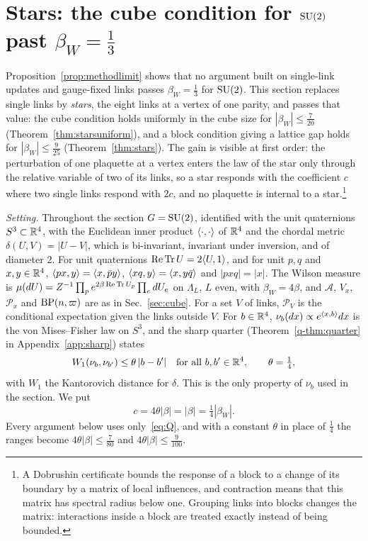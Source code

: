 \section{Stars: the cube condition for \texorpdfstring{$\mathrm{SU}(2)$}{SU(2)} past \texorpdfstring{$\beta_W=\frac13$}{beta\_W=1/3}}\label{sec:stars}

Proposition~\ref{prop:methodlimit} shows that no argument built on single-link
updates and gauge-fixed links passes $\beta_W=\frac13$ for $\mathrm{SU}(2)$. This
section replaces single links by \emph{stars}, the eight links at a vertex of
one parity, and passes that value: the cube condition holds uniformly in the
cube size for $|\beta_W|\le\frac7{20}$
(Theorem~\ref{thm:starsuniform}), and a block condition giving a lattice gap
holds for $|\beta_W|\le\frac9{25}$ (Theorem~\ref{thm:stars}). The gain is
visible at first order: the perturbation of one plaquette at a vertex enters
the law of the star only through the relative variable of two of its links,
so a star responds with the coefficient $c$ where two single links respond
with $2c$, and no plaquette is internal to a star.\footnote{A Dobrushin
certificate bounds the response of a block to a change of its boundary by a
matrix of local influences, and contraction means that this matrix has
spectral radius below one. Grouping links into blocks changes the matrix:
interactions inside a block are treated exactly instead of being bounded.}

\emph{Setting.} Throughout the section $G=\mathrm{SU}(2)$, identified with the unit
quaternions $S^3\subset\mathbb{R}^4$, with the Euclidean inner product
$\langle \cdot,\cdot\rangle$ of $\mathbb{R}^4$ and the chordal metric $\delta(U,V)=|U-V|$, which is
bi-invariant, invariant under inversion, and of diameter $2$. For unit
quaternions $\operatorname{Re}\operatorname{Tr} U=2\langle U,1\rangle$, and for unit $p,q$ and $x,y\in\mathbb{R}^4$,
$\langle px,y\rangle=\langle x,\bar py\rangle$, $\langle xq,y\rangle=\langle x,y\bar q\rangle$ and $|pxq|=|x|$. The
Wilson measure is $\mu(dU)=Z^{-1}\prod_pe^{2\beta\operatorname{Re}\operatorname{Tr} U_p}\prod_edU_e$ on
$\Lambda_L$, $L$ even, with $\beta_W=4\beta$, and $\mathcal A$, $V_x$,
$\mathcal P_x$ and $\mathrm{BP}(n,\varpi)$ are as in Sec.~\ref{sec:cube}. For a set
$V$ of links, $\mathcal P_V$ is the conditional expectation given the links
outside $V$. For $b\in\mathbb{R}^4$, $\nu_b(dx)\propto e^{\langle x,b\rangle}dx$ is the von
Mises--Fisher law on $S^3$, and the sharp quarter (Theorem~\ref{q-thm:quarter}
in Appendix~\ref{app:sharp}) states
\begin{equation}\label{eq:Q}
W_1(\nu_b,\nu_{b'})\le\theta\,|b-b'|\quad\text{for all }b,b'\in\mathbb{R}^4,
\qquad\theta=\tfrac14,
\end{equation}
with $W_1$ the Kantorovich distance for $\delta$. This is the only property of
$\nu_b$ used in the section. We put
\[
c=4\theta|\beta|=|\beta|=\tfrac14|\beta_W| .
\]
Every argument below uses only~\eqref{eq:Q}, and with a constant $\theta$ in
place of $\frac14$ the ranges become $4\theta|\beta|\le\frac7{80}$ and
$4\theta|\beta|\le\frac9{100}$.


